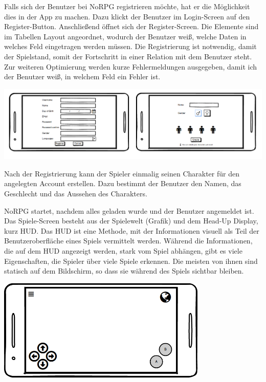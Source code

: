 			Falls sich der Benutzer bei NoRPG registrieren möchte, hat er die Möglichkeit dies in der App zu machen. Dazu klickt der Benutzer im Login-Screen auf den Register-Button. Anschließend öffnet sich der Register-Screen. Die Elemente sind im Tabellen Layout angeordnet, wodurch der Benutzer weiß, welche Daten in welches Feld eingetragen werden müssen. Die Registrierung ist notwendig, damit der Spielstand, somit der Fortschritt in einer Relation mit dem Benutzer steht. Zur weiteren Optimierung werden kurze Fehlermeldungen ausgegeben, damit ich der Benutzer weiß, in welchem Feld ein Fehler ist.
			
			\begin{center}
				\includegraphics[width=\textwidth]{pics/Registerprozess.png}
			\end{center}
			
			Nach der Registrierung kann der Spieler einmalig seinen Charakter für den angelegten Account erstellen. Dazu bestimmt der Benutzer den Namen, das Geschlecht und das Aussehen des Charakters.
			
			NoRPG startet, nachdem alles geladen wurde und der Benutzer angemeldet ist. Das Spiele-Screen besteht aus der Spielewelt (Grafik) und dem Head-Up Display, kurz HUD. Das HUD ist eine Methode, mit der Informationen visuell als Teil der Benutzeroberfläche eines Spiels vermittelt werden. Während die Informationen, die auf dem HUD angezeigt werden, stark vom Spiel abhängen, gibt es viele Eigenschaften, die Spieler über viele Spiele erkennen. Die meisten von ihnen sind statisch auf dem Bildschirm, so dass sie während des Spiels sichtbar bleiben. 
			
			\begin{center}
				\includegraphics[width=10cm]{pics/HUD.png}
			\end{center}
			

